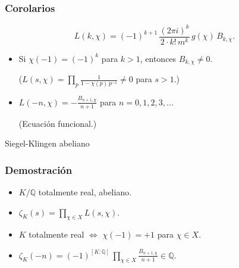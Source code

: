 \documentclass{beamer}
\newcommand{\QQ}{\mathbb{Q}}
\begin{document}

\begin{frame}
  \frametitle{Corolarios}

  \[ L (k,\chi) = (-1)^{k+1}\,\frac{(2\pi i)^k}{2\cdot k!\,m^k}\,g (\chi)\,B_{k,\overline{\chi}}. \]

  \begin{itemize}
  \item<2-> Si $\chi (-1) = (-1)^k$ para $k > 1$, entonces $B_{k,\chi} \ne 0$.

    ($L (s,\chi) = \prod_p \frac{1}{1 - \chi (p)\,p^{-s}} \ne 0$ para $s > 1$.)

  \item<3-> $L (-n,\chi) = -\frac{B_{n+1,\chi}}{n+1}$ para $n = 0,1,2,3,\ldots$

    (Ecuación funcional.)
  \end{itemize}
\end{frame}


\begin{frame}[plain]
  \headingfont

  \begin{center}
    {\huge Siegel-Klingen abeliano}
  \end{center}
\end{frame}


\begin{frame}
  \frametitle{Demostración}

  \begin{itemize}
  \item<1-> $K/\QQ$ totalmente real, abeliano.

  \item<2-> $\zeta_K (s) = \prod_{\chi\in X} L (s,\chi)$.

  \item<3-> $K$ totalmente real $\iff$ $\chi (-1) = +1$ para $\chi \in X$.

  \item<4-> $\zeta_K (-n) = (-1)^{[K:\QQ]}\,\prod_{\chi \in X} \frac{B_{n+1,\chi}}{n+1} \in \QQ$.
  \end{itemize}
\end{frame}

\end{document}
